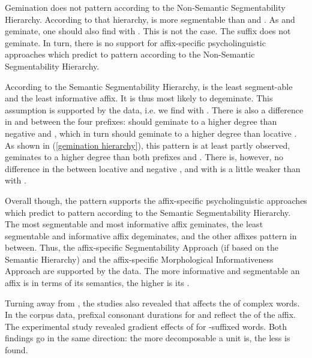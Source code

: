Gemination does not pattern according to the Non-Semantic Segmentability Hierarchy. According to that hierarchy,  is more segmentable than  and . As  and  geminate, one should also find  with . This is not the case. The suffix  does not geminate.  In turn, there is no support for affix-specific psycholinguistic approaches which predict  to pattern according to the Non-Semantic Segmentability Hierarchy.\largerpage


According to the Semantic Segmentability Hierarchy,  is the least segment-able and the least informative affix. It is thus most likely to degeminate. This assumption is supported by the data, i.e. we find  with . There is also a difference in  and  between the four prefixes:  should geminate to a higher degree than negative  and , which in turn should geminate to a higher degree than locative . As shown in (\ref{gemination hierarchy}), this pattern is at least partly observed,  geminates to a higher degree than both prefixes and . There is, however, no difference in the  between locative  and negative , and  with  is a little weaker than  with . 


Overall though, the  pattern supports the affix-specific psycholinguistic approaches which predict  to pattern according to the Semantic Segmentability Hierarchy. The most segmentable and most informative affix  geminates, the least segmentable and informative affix  degeminates, and the other affixes pattern in between.
Thus, the affix-specific Segmentability Approach (if based on the Semantic Hierarchy) and the affix-specific Morphological Informativeness Approach are supported by the data. The more informative and segmentable an affix is in terms of its semantics, the higher is its .


Turning away from , the studies also revealed that  affects the  of complex words.
 In the corpus data, prefixal consonant durations for  and  reflect the  of the affix. 
The experimental study revealed gradient effects of  for -suffixed words. 
Both findings go in the same direction: the more decomposable a unit is, the less  is found. 

